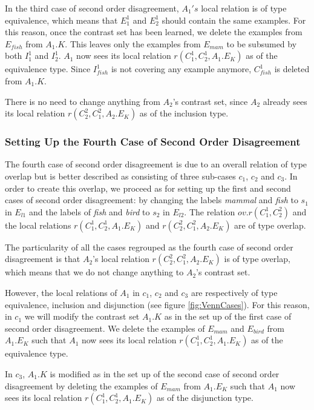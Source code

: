 In the third case of second order disagreement, $A_{1}'s$ local relation is of type equivalence, which means that $E_{1}^{1}$ and $E_{2}^{1}$ should contain the same examples. For this reason, once the contrast set has been learned, we delete the examples from  $E_{fish}$ from $A_{1}.K$. This leaves only the examples from $E_{mam}$ to be subsumed by both $I_{1}^{1}$ and $I_{2}^{1}$. $A_{1}$ now sees its local relation $r(C_{1}^{1},C_{2}^{1},A_{1}.E_{K})$ as of the equivalence type. Since $I_{fish}^{1}$ is not covering any example anymore, $C_{fish}^{1}$ is deleted from $A_{1}.K$.

There is no need to change anything from $A_{2}$'s contrast set, since $A_{2}$ already sees its local relation $r(C_{2}^{2},C_{1}^{2},A_{2}.E_{K})$ as of the inclusion type.

\subsubsection{Setting Up the Fourth Case of Second Order Disagreement}

The fourth case of second order disagreement is due to an overall relation of type overlap but is better described as consisting of 
 three sub-cases $c_{1}$, $c_{2}$ and $c_{3}$. In order to create this overlap, we proceed as for setting up the first and second cases of second order disagreement: by changing the labels \emph{mammal} and \emph{fish} to $s_{1}$ in $E_{l1}$ and the labels of \emph{fish} and \emph{bird} to $s_{2}$ in $E_{l2}$. The relation $ov.r(C_{1}^{1}, C_{2}^{2})$ and the local relations $r(C_{1}^{1},C_{2}^{1},A_{1}.E_{K})$ and $r(C_{2}^{2},C_{1}^{2},A_{2}.E_{K})$ are of type overlap.

The particularity of all the cases regrouped as the fourth case of second order disagreement is that $A_{2}$'s local relation $r(C_{2}^{2},C_{1}^{2},A_{2}.E_{K})$ is of type overlap, which means that we do not change anything to $A_{2}$'s contrast set.

However, the local relations of $A_{1}$ in $c_{1}$, $c_{2}$ and $c_{3}$ are respectively of type equivalence, inclusion and disjunction (see figure \ref{fig:VennCases}). For this reason, in $c_{1}$ we will modify the contrast set $A_{1}.K$ as in the set up of the first case of second order disagreement. We delete the examples of $E_{mam}$ and $E_{bird}$ from $A_{1}.E_{K}$ such that $A_{1}$ now sees its local relation $r(C_{1}^{1},C_{2}^{1},A_{1}.E_{K})$ as of the equivalence type.

In $c_{3}$, $A_{1}.K$ is modified as in the set up of the second case of second order disagreement by deleting the examples of $E_{mam}$ from $A_{1}.E_{K}$ such that $A_{1}$ now sees its local relation $r(C_{1}^{1},C_{2}^{1},A_{1}.E_{K})$ as of the disjunction type.

